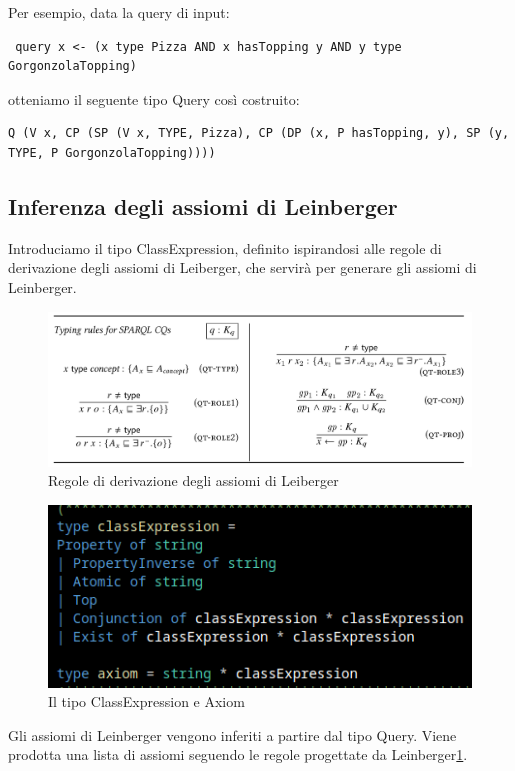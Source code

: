 Per esempio, data la query di input:

\begin{verbatim}
 query x <- (x type Pizza AND x hasTopping y AND y type GorgonzolaTopping)
\end{verbatim}

otteniamo il seguente tipo Query così costruito:

\begin{verbatim}
Q (V x, CP (SP (V x, TYPE, Pizza), CP (DP (x, P hasTopping, y), SP (y, TYPE, P GorgonzolaTopping))))
\end{verbatim}

\subsection{Inferenza degli assiomi di Leinberger}
Introduciamo il tipo ClassExpression, definito ispirandosi alle regole di derivazione degli assiomi di Leiberger, che servirà per generare gli assiomi di Leinberger.
\begin{figure}[H]
    \centering
    \includegraphics[width=\textwidth]{pictures/leinbergAxiom.png}
    \caption{Regole di derivazione degli assiomi di Leiberger}
    \label{fig:leinbergerAxiom}
\end{figure}

\begin{figure}[H]
    \centering
    \includegraphics[width=\textwidth]{pictures/classExpressionType.png}
    \caption{Il tipo ClassExpression e Axiom}
    \label{fig:enter-label}
\end{figure}
Gli assiomi di Leinberger vengono inferiti a partire dal tipo Query. Viene prodotta una lista di assiomi seguendo le regole progettate da Leinberger\ref{fig:leinbergerAxiom}.

